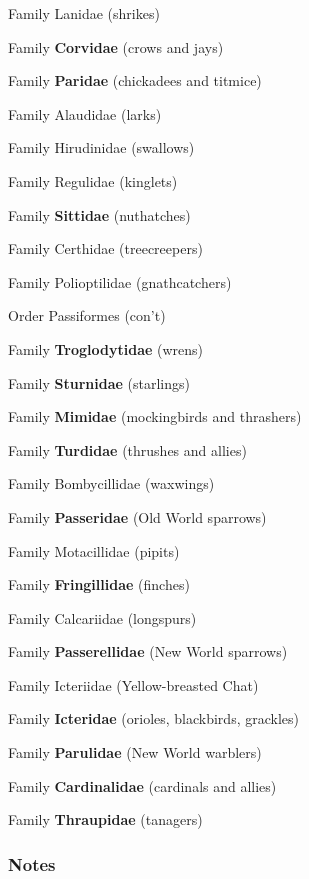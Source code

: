\documentclass[10pt]{article}
\newlength\mylength
\newcommand*{\resetparindent}{\setlength{\parindent}{0pt}}
\newcommand*{\growparindent}{\addtolength{\parindent}{\mylength}}
\newcommand*{\reduceparindent}{\addtolength{\parindent}{-1\mylength}}
\begin{document}
\begin{multicols}{2}
\begin{spacing}{1.35}
	  	Family Lanidae (shrikes)
	  	
	  	Family \textbf{Corvidae} (crows and jays)
	  	
	  	Family \textbf{Paridae} (chickadees and titmice)
	  	
	  	Family Alaudidae (larks)
	  	
	  	Family Hirudinidae (swallows)
	  	
	  	Family Regulidae (kinglets)
	  	
	  	Family \textbf{Sittidae} (nuthatches)
	  	
	  	Family Certhidae (treecreepers)
	  	
	  	Family Polioptilidae (gnathcatchers)
	  	
	  \reduceparindent
	  
	  Order Passiformes (con't)
	  
	  	\growparindent

	  	Family \textbf{Troglodytidae} (wrens)
	  	
	  	Family \textbf{Sturnidae} (starlings)
	  	
	  	Family \textbf{Mimidae} (mockingbirds and thrashers)
	  	
	  	Family \textbf{Turdidae} (thrushes and allies)
	  	
	  	Family Bombycillidae (waxwings)
	  	
	  	Family \textbf{Passeridae} (Old World sparrows)
	  	
	  	Family Motacillidae (pipits)
	  	
	  	\reduceparindent
	  	Family \textbf{Fringillidae} (finches)
	  	
	  	Family Calcariidae (longspurs)
	  	
	  	Family \textbf{Passerellidae} (New World sparrows)
	  	
	  	Family Icteriidae (Yellow-breasted Chat)
	  	
	  	Family \textbf{Icteridae} (orioles, blackbirds, grackles)
	  	
	  	Family \textbf{Parulidae} (New World warblers)
	  	
	  	Family \textbf{Cardinalidae} (cardinals and allies)
	  	
	  	Family \textbf{Thraupidae} (tanagers)
     
\resetparindent
      
\end{spacing}

\end{multicols}

\subsubsection*{Notes}
\end{document}
